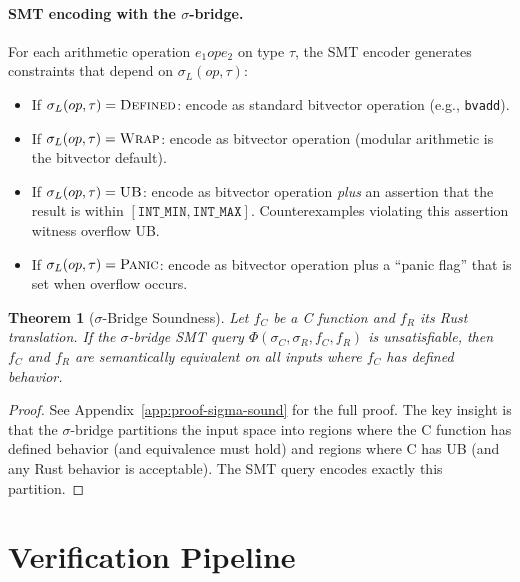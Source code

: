 \documentclass[11pt,a4paper]{article}
\newtheorem{theorem}{Theorem}
\begin{document}
\paragraph{SMT encoding with the $\sigma$-bridge.}
For each arithmetic operation $e_1 \mathbin{op} e_2$ on type $\tau$,
the SMT encoder generates constraints that depend on
$\sigma_L(op, \tau)$:

\begin{itemize}
\item If $\sigma_L(op, \tau) = \textsc{Defined}$: encode as standard
  bitvector operation (e.g., \texttt{bvadd}).
\item If $\sigma_L(op, \tau) = \textsc{Wrap}$: encode as bitvector
  operation (modular arithmetic is the bitvector default).
\item If $\sigma_L(op, \tau) = \textsc{UB}$: encode as bitvector
  operation \emph{plus} an assertion that the result is within
  $[\texttt{INT\_MIN}, \texttt{INT\_MAX}]$.  Counterexamples
  violating this assertion witness overflow UB.
\item If $\sigma_L(op, \tau) = \textsc{Panic}$: encode as bitvector
  operation plus a ``panic flag'' that is set when overflow occurs.
\end{itemize}

\begin{theorem}[$\sigma$-Bridge Soundness]\label{thm:sigma-sound}
Let $f_C$ be a C function and $f_R$ its Rust translation.  If the
$\sigma$-bridge SMT query $\Phi(\sigma_C, \sigma_R, f_C, f_R)$ is
unsatisfiable, then $f_C$ and $f_R$ are semantically equivalent on all
inputs where $f_C$ has defined behavior.
\end{theorem}

\begin{proof}
See Appendix~\ref{app:proof-sigma-sound} for the full proof.  The key
insight is that the $\sigma$-bridge partitions the input space into
regions where the C function has defined behavior (and equivalence must
hold) and regions where C has UB (and any Rust behavior is acceptable).
The SMT query encodes exactly this partition.
\end{proof}


\section{Verification Pipeline}\label{sec:pipeline}
\end{document}
